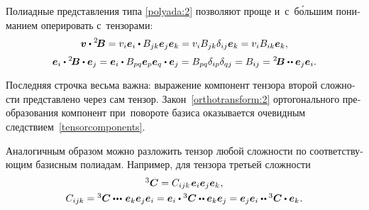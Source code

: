 \begin{otherlanguage}{russian}
Полиадные представления типа \eqref{polyada:2} позволяют проще и~с~б\'{о}льшим пониманием оперировать с~тензорами:
\[ \bm{v} \dotp {^2\!\bm{B}} = v_i\bm{e}_i \dotp B_{jk}\bm{e}_j\bm{e}_k = v_i B_{jk} \delta_{ij} \bm{e}_k = v_i B_{ik} \bm{e}_k, \]\vspace{-1.25em}
\begin{equation}\label{tensorcomponents}
\bm{e}_i \dotp {^2\!\bm{B}} \dotp \bm{e}_j = \bm{e}_i \dotp B_{pq}\bm{e}_p\bm{e}_q \dotp \bm{e}_j = B_{pq} \delta_{ip} \delta_{qj} = B_{ij} = {^2\!\bm{B}} \dotdotp \bm{e}_j \bm{e}_i.
\end{equation}

Последняя строчка весьма важна: выражение компонент тензора второй сложности представлено через сам тензор. Закон~\eqref{orthotransform:2} ортогонального преобразования компонент при~повороте базиса оказывается очевидным следствием~\eqref{tensorcomponents}.

Аналогичным образом можно разложить тензор любой сложности по соответствующим базисным полиадам. Например, для тензора третьей сложности
\vspace{0.2em}\begin{equation}\label{polyada:3}
\begin{array}{c}
{^3\!\,\bm{C}} = C_{ijk} \hspace{0.2ex} \bm{e}_i \bm{e}_j \bm{e}_k \hspace{0.1ex},\\[0.8ex]
C_{ijk} = {^3\!\,\bm{C}} \dotdotdotp \bm{e}_k \bm{e}_j \bm{e}_i = \bm{e}_i \dotp {^3\!\,\bm{C}} \dotdotp \bm{e}_k \bm{e}_j = \bm{e}_j \bm{e}_i \dotdotp {^3\!\,\bm{C}} \dotp \bm{e}_k \hspace{0.1ex}.
\end{array}
\end{equation}


\end{otherlanguage}
